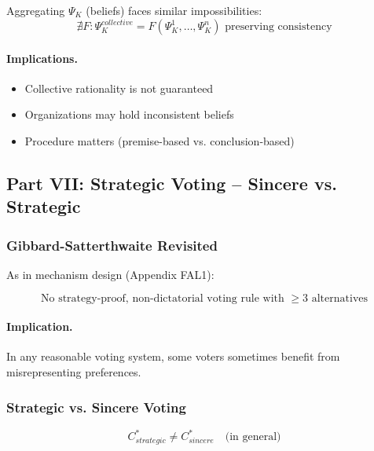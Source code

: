 Aggregating $\Psi_K$ (beliefs) faces similar impossibilities:
\begin{equation}
\nexists F: \Psi_K^{collective} = F(\Psi_K^1, \ldots, \Psi_K^n) \text{ preserving consistency}
\end{equation}

\paragraph{Implications.}
\begin{itemize}
    \item Collective rationality is not guaranteed
    \item Organizations may hold inconsistent beliefs
    \item Procedure matters (premise-based vs. conclusion-based)
\end{itemize}

\subsection{Part VII: Strategic Voting – Sincere vs. Strategic}

\subsubsection{Gibbard-Satterthwaite Revisited}

As in mechanism design (Appendix FAL1):

\begin{equation}
\boxed{
\text{No strategy-proof, non-dictatorial voting rule with } \geq 3 \text{ alternatives}
}
\label{eq:gs-voting}
\end{equation}

\paragraph{Implication.}
In any reasonable voting system, some voters sometimes benefit from misrepresenting preferences.

\subsubsection{Strategic vs. Sincere Voting}

\begin{equation}
C^*_{strategic} \neq C^*_{sincere} \quad \text{(in general)}
\end{equation}

